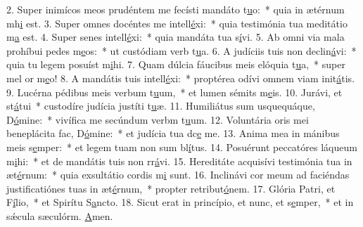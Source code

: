 2. Super inimícos meos prudéntem me fecísti mandáto t\uline{u}o:~* quia in ætérnum mh\uline{i} est.
3. Super omnes docéntes me intell\uline{é}xi:~* quia testimónia tua meditátio m\uline{a} est.
4. Super senes intell\uline{é}xi:~* quia mandáta tua s\uline{í}vi.
5. Ab omni via mala prohíbui pedes m\uline{e}os:~* ut custódiam verb t\uline{u}a.
6. A judíciis tuis non declin\uline{á}vi:~* quia tu legem posuíst m\uline{i}hi.
7. Quam dúlcia fáucibus meis elóquia t\uline{u}a,~* super mel or m\uline{e}o!
8. A mandátis tuis intell\uline{é}xi:~* proptérea odívi omnem viam init\uline{á}tis.
9. Lucérna pédibus meis verbum t\uline{u}um,~* et lumen sémits m\uline{e}is.
10. Jurávi, et st\uline{á}tui~* custodíre judícia justíti t\uline{u}æ.
11. Humiliátus sum usquequáque, D\uline{ó}mine:~* vivífica me secúndum verbm t\uline{u}um.
12. Voluntária oris mei beneplácita fac, D\uline{ó}mine:~* et judícia tua dc\uline{e} me.
13. Anima mea in mánibus meis s\uline{e}mper:~* et legem tuam non sum bl\uline{í}tus.
14. Posuérunt peccatóres láqueum m\uline{i}hi:~* et de mandátis tuis non rr\uline{á}vi.
15. Hereditáte acquisívi testimónia tua in æt\uline{é}rnum:~* quia exsultátio cordis m\uline{i} sunt.
16. Inclinávi cor meum ad faciéndas justificatiónes tuas in æt\uline{é}rnum,~* propter retribut\uline{ó}nem.
17. Glória Patri, et F\uline{í}lio,~* et Spirítu S\uline{a}ncto.
18. Sicut erat in princípio, et nunc, et s\uline{e}mper,~* et in sǽcula sæculórm. \uline{A}men.
